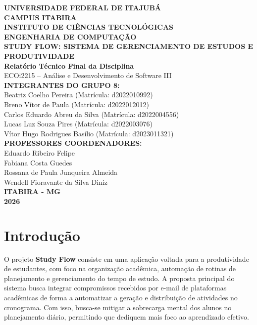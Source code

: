 \documentclass[12pt,a4paper]{article}
\begin{document}
\begin{titlepage}
    \begin{center}
        \large\textbf{UNIVERSIDADE FEDERAL DE ITAJUBÁ}\\
        \large\textbf{CAMPUS ITABIRA}\\
        \large\textbf{INSTITUTO DE CIÊNCIAS TECNOLÓGICAS}\\
        \large\textbf{ENGENHARIA DE COMPUTAÇÃO}\\
        \vspace{3.5cm}
        \Large\textbf{STUDY FLOW: SISTEMA DE GERENCIAMENTO DE ESTUDOS E PRODUTIVIDADE}\\
        \vspace{1.5cm}
        \Large\textbf{Relatório Técnico Final da Disciplina}\\
        \large{ECOi2215 -- Análise e Desenvolvimento de Software III}\\
        \vspace{2.5cm}
        \large\textbf{INTEGRANTES DO GRUPO 8:}\\
        \vspace{0.5cm}
        \large{Beatriz Coelho Pereira (Matrícula: d2022010992)}\\
        \large{Breno Vítor de Paula (Matrícula: d2022012012)}\\
        \large{Carlos Eduardo Abreu da Silva (Matrícula: d2022004556)}\\
        \large{Lucas Luz Souza Pires (Matrícula: d2022003076)}\\
        \large{Vítor Hugo Rodrigues Basílio (Matrícula: d2023011321)}\\
        \vspace{3cm}
        \large\textbf{PROFESSORES COORDENADORES:}\\
        \large{Eduardo Ribeiro Felipe}\\
        \large{Fabiana Costa Guedes}\\
        \large{Rossana de Paula Junqueira Almeida}\\
        \large{Wendell Fioravante da Silva Diniz}\\
        \vfill
        \large\textbf{ITABIRA - MG}\\
        \large\textbf{2026}
    \end{center}
\end{titlepage}

\newpage
\tableofcontents
\newpage

\section{Introdução}
O projeto \textbf{Study Flow} consiste em uma aplicação voltada para a produtividade de estudantes, com foco na organização acadêmica, automação de rotinas de planejamento e gerenciamento do tempo de estudo. A proposta principal do sistema busca integrar compromissos recebidos por e-mail de plataformas acadêmicas de forma a automatizar a geração e distribuição de atividades no cronograma. Com isso, busca-se mitigar a sobrecarga mental dos alunos no planejamento diário, permitindo que dediquem mais foco ao aprendizado efetivo.
\end{document}

